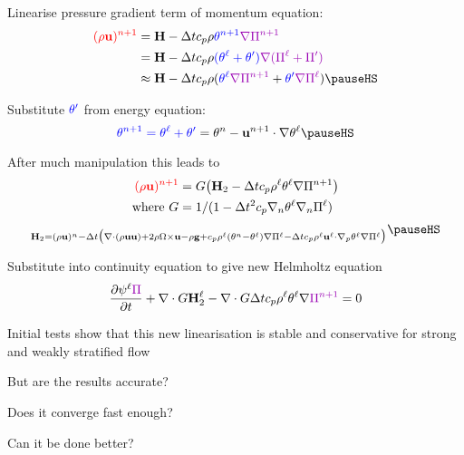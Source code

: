 \begin{slide}

\begin{list0}\raggedright
\item Linearise pressure gradient term of momentum equation:
\begin{align*}
{\color{red} (\rho\mathbf{u})^{n+1}} &=
\mathbf{H}
- \Delta t c_p \rho {\color{blue}\theta^{n+1}}{\color{purple} \nabla \Pi^{n+1}}\\
&=\mathbf{H}
- \Delta t c_p \rho {\color{blue}(\theta^\ell+\theta^\prime)}{\color{purple}
\nabla (\Pi^\ell + \Pi^\prime)}\\
&\approx \mathbf{H}
- \Delta t c_p \rho ({\color{blue}\theta^\ell}{\color{purple}
\nabla \Pi^{n+1}} + {\color{blue}\theta^\prime}{\color{purple}
\nabla \Pi^\ell})\pauseHS
\end{align*}
\item Substitute $\color{blue}\theta^\prime$ from energy equation:
\[
{\color{blue}\theta^{n+1} = \theta^\ell+\theta^\prime}
= \theta^n
- \mathbf{u}^{n+1}\cdot\nabla\theta^\ell \pauseHS
\]
\item After much manipulation this leads to
\begin{align*}
{\color{red}(\rho\mathbf{u})^{n+1}} &= 
G\bigl(
    \mathbf{H}_2
  - \Delta t c_p \rho^\ell\theta^\ell\nabla\Pi^{n+1}
\bigr)
\\
\text{where } G &= 1/(1-\Delta t^2 c_p \nabla_n\theta^\ell \nabla_n\Pi^\ell)
\end{align*}
\[
_{
\mathbf{H}_2 = (\rho\mathbf{u})^n- \Delta t
\bigl(
    \nabla\cdot(\rho\mathbf{uu}) + 2\rho\Omega\times\mathbf{u}
  - \rho\mathbf{g}
  + c_p\rho^\ell(\theta^n-\theta^\ell)\nabla\Pi^\ell
  -\Delta t c_p \rho^\ell \mathbf{u}^\ell\cdot\nabla_p\theta^\ell
  \nabla\Pi^\ell
\bigr)}\pauseHS
\]
\item Substitute into continuity equation to give new Helmholtz equation
\[
\frac{\partial\psi^\ell{\color{purple}\Pi}}{\partial t}
+\nabla\cdot G\mathbf{H}_2^\ell - \nabla\cdot G\Delta t c_p \rho^\ell \theta^\ell\nabla{\color{purple}\Pi^{n+1}}=0
\]
\end{list0}
\end{slide}

\begin{slide}

\begin{list0}
\item Initial tests show that this new linearisation is stable and conservative for strong and weakly stratified flow
\item But are the results accurate?
\item Does it converge fast enough?
\item Can it be done better?
\end{list0}

\end{slide}

